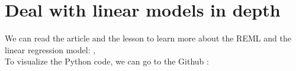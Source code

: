 \documentclass{article}
\begin{document}
\section{Deal with linear models in depth}
\label{sec:pour_aller_plus_loin_sur_ce_theme}
We can read the article and the lesson to learn more about the REML and the linear regression model:
\cite{Google}, \cite{Teaching}\\
To visualize the Python code, we can go to the Github :
\cite{Code}



\end{document}
